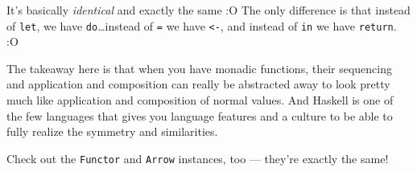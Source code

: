 \documentclass[]{article}
\newenvironment{Shaded}{}{}
\newcommand{\CommentTok}[1]{\textcolor[rgb]{0.38,0.63,0.69}{\textit{#1}}}
\newcommand{\DataTypeTok}[1]{\textcolor[rgb]{0.56,0.13,0.00}{#1}}
\newcommand{\FunctionTok}[1]{\textcolor[rgb]{0.02,0.16,0.49}{#1}}
\newcommand{\KeywordTok}[1]{\textcolor[rgb]{0.00,0.44,0.13}{\textbf{#1}}}
\newcommand{\NormalTok}[1]{#1}
\newcommand{\OperatorTok}[1]{\textcolor[rgb]{0.40,0.40,0.40}{#1}}
\newcommand{\OtherTok}[1]{\textcolor[rgb]{0.00,0.44,0.13}{#1}}
\begin{document}
\begin{Shaded}
\end{Shaded}

It's basically \emph{identical} and exactly the same :O The only difference is
that instead of \texttt{let}, we have \texttt{do}\ldots instead of \texttt{=} we
have \texttt{\textless{}-}, and instead of \texttt{in} we have \texttt{return}.
:O

The takeaway here is that when you have monadic functions, their sequencing and
application and composition can really be abstracted away to look pretty much
like application and composition of normal values. And Haskell is one of the few
languages that gives you language features and a culture to be able to fully
realize the symmetry and similarities.

Check out the \texttt{Functor} and \texttt{Arrow} instances, too --- they're
exactly the same!
\end{document}
